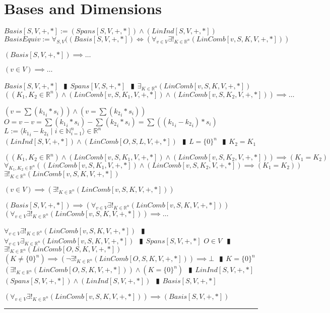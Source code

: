 \documentclass{book}
\newcommand{\abr}{:=}
\newcommand{\pipe}{$\phantom{(}\vrectangleblack\phantom{)}$}
\newcommand{\st}{\mathbin{|}}
\begin{document}
\section{Bases and Dimensions}
$Basis[S, V, +, *] \abr (Spans[S, V, +, *]) \land (LinInd[S, V, +, *])$ \\

$BasisEquiv \abr \forall_{S, V}((Basis[S, V, +, *]) \iff (\forall_{v \in V} \exists!_{K \in \mathbb{R}^n}(LinComb[v, S, K, V, +, *]))$
\begin{enumerate}
  \lit $(Basis[S, V, +, *]) \implies \ldots$
  \begin{enumerate}
    \lit $(v \in V) \implies \ldots$
    \begin{enumerate}
      \lit $Basis[S, V, +, *]$ \pipe $Spans[V, S, +, *]$ \pipe $\exists_{K \in \mathbb{R}^n}(LinComb[v, S, K, V, +, *])$
      \lit $((K_1, K_2 \in \mathbb{R}^n) \land (LinComb[v, S, K_1, V, +, *]) \land (LinComb[v, S, K_2, V, +, *])) \implies \ldots$
      \begin{enumerate}
        \lit $(v = \sum({k_1}_i * s_i)) \land (v = \sum({k_2}_i * s_i))$
        \lit $O = v - v = \sum({k_1}_i * s_i) - \sum({k_2}_i * s_i) = \sum(({k_1}_i - {k_2}_i) * s_i)$
        \lit $L \abr \langle {k_1}_i - {k_2}_i \st i \in \mathbb{N}_{i = 1}^n \rangle \in \mathbb{R}^n$
        \lit $(LinInd[S, V, +, *]) \land (LinComb[O, S, L, V, +, *])$ \pipe $L = \{0\}^n$ \pipe $K_2 = K_1$
      \end{enumerate}
      \lit $((K_1, K_2 \in \mathbb{R}^n) \land (LinComb[v, S, K_1, V, +, *]) \land (LinComb[v, S, K_2, V, +, *])) \implies (K_1 = K_2)$
      \lit $\forall_{K_1, K_2 \in \mathbb{R}^n}((LinComb[v, S, K_1, V, +, *]) \land (LinComb[v, S, K_2, V, +, *]) \implies (K_1 = K_2))$
      \lit $\exists!_{K \in \mathbb{R}^n}(LinComb[v, S, K, V, +, *])$
    \end{enumerate}
    \lit $(v \in V) \implies (\exists!_{K \in \mathbb{R}^n}(LinComb[v, S, K, V, +, *]))$
    \end{enumerate}
  \lit $(Basis[S, V, +, *]) \implies (\forall_{v \in V} \exists!_{K \in \mathbb{R}^n}(LinComb[v, S, K, V, +, *]))$
  \lit $(\forall_{v \in V} \exists!_{K \in \mathbb{R}^n}(LinComb[v, S, K, V, +, *])) \implies \ldots$
  \begin{enumerate}
    \lit $\forall_{v \in V} \exists!_{K \in \mathbb{R}^n}(LinComb[v, S, K, V, +, *])$ \pipe $\forall_{v \in V} \exists_{K \in \mathbb{R}^n}(LinComb[v, S, K, V, +, *])$ \pipe $Spans[S, V, +, *]$
    \lit $O \in V$ \pipe $\exists!_{K \in \mathbb{R}^n}(LinComb[O, S, K, V, +, *])$
    \lit $(K \neq \{0\}^n) \implies (\lnot \exists!_{K \in \mathbb{R}^n}(LinComb[O, S, K, V, +, *])) \implies \bot$ \pipe $K = \{0\}^n$
    \lit $(\exists!_{K \in \mathbb{R}^n}(LinComb[O, S, K, V, +, *])) \land (K = \{0\}^n)$ \pipe $LinInd[S, V, +, *]$
    \lit $(Spans[S, V, +, *]) \land (LinInd[S, V, +, *])$ \pipe $Basis[S, V, +, *]$
  \end{enumerate}
  \lit $(\forall_{v \in V} \exists!_{K \in \mathbb{R}^n}(LinComb[v, S, K, V, +, *])) \implies (Basis[S, V, +, *])$
\end{enumerate} \vspace{.75mm} \hrule \vspace{.75mm} \ \\ 
\end{document}
